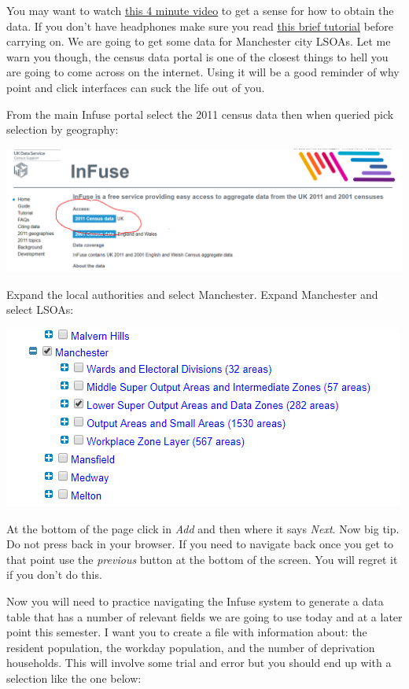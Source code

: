 \documentclass[
]{book}
\begin{document}
You may want to watch \href{https://www.youtube.com/watch?v=AzK04BOFd_s\#t=17}{this 4 minute video} to get a sense for how to obtain the data. If you don't have headphones make sure you read \href{http://infuse.ukdataservice.ac.uk/help/tutorial.html}{this brief tutorial} before carrying on. We are going to get some data for Manchester city LSOAs. Let me warn you though, the census data portal is one of the closest things to hell you are going to come across on the internet. Using it will be a good reminder of why point and click interfaces can suck the life out of you.

From the main Infuse portal select the 2011 census data then when queried pick selection by geography:

\includegraphics{img/infuse1.png}

Expand the local authorities and select Manchester. Expand Manchester and select LSOAs:

\includegraphics{img/infuse2.png}

At the bottom of the page click in \emph{Add} and then where it says \emph{Next}. Now big tip. Do not press back in your browser. If you need to navigate back once you get to that point use the \emph{previous} button at the bottom of the screen. You will regret it if you don't do this.

Now you will need to practice navigating the Infuse system to generate a data table that has a number of relevant fields we are going to use today and at a later point this semester. I want you to create a file with information about: the resident population, the workday population, and the number of deprivation households. This will involve some trial and error but you should end up with a selection like the one below:
\end{document}
